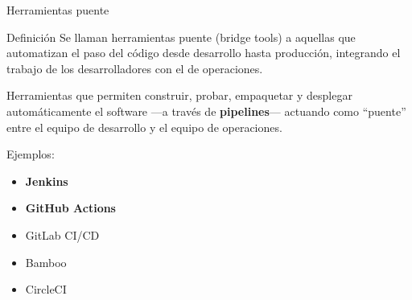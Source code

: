 \documentclass{beamer}
\begin{document}
\begin{frame}{Herramientas puente}

\begin{block}{Definición}
Se llaman herramientas puente (bridge tools) a aquellas que automatizan el paso del código desde desarrollo hasta producción, integrando el trabajo de los desarrolladores con el de operaciones.

Herramientas que permiten construir, probar, empaquetar y desplegar automáticamente el software —a través de \textbf{pipelines}— actuando como “puente” entre el equipo de desarrollo y el equipo de operaciones.
\end{block}

Ejemplos:
\begin{itemize}
    \item \textbf{Jenkins}
    \item \textbf{GitHub Actions}
    \item GitLab CI/CD
    \item Bamboo
    \item CircleCI
\end{itemize}
    
\end{frame}
\end{document}
